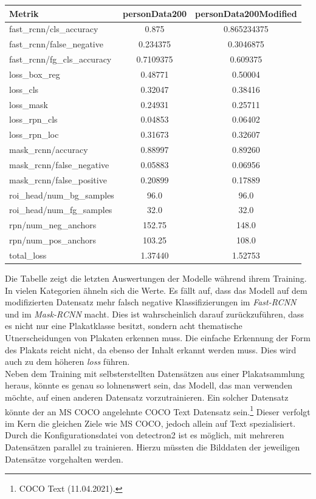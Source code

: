 \documentclass[a4paper,12pt,ngerman]{article}
\begin{document}
\begin{tabular}[h]{l|c|c}
	Metrik & personData200 & personData200Modified \\
	\hline
	fast\_rcnn/cls\_accuracy & 0.875 & 0.865234375 \\
	fast\_rcnn/false\_negative & 0.234375 & 0.3046875 \\
	fast\_rcnn/fg\_cls\_accuracy & 0.7109375 & 0.609375 \\
	\hline
	loss\_box\_reg & 0.48771 & 0.50004 \\
	loss\_cls & 0.32047 & 0.38416 \\
	loss\_mask & 0.24931 & 0.25711 \\
	loss\_rpn\_cls & 0.04853 & 0.06402 \\
	loss\_rpn\_loc & 0.31673 & 0.32607 \\
	\hline
	mask\_rcnn/accuracy & 0.88997 & 0.89260 \\
	mask\_rcnn/false\_negative & 0.05883 & 0.06956 \\
	mask\_rcnn/false\_positive & 0.20899 & 0.17889 \\
	\hline
	roi\_head/num\_bg\_samples & 96.0 & 96.0 \\
	roi\_head/num\_fg\_samples & 32.0 & 32.0 \\
	\hline
	rpn/num\_neg\_anchors & 152.75 & 148.0 \\
	rpn/num\_pos\_anchors & 103.25 & 108.0 \\
	\hline
	total\_loss & 1.37440 & 1.52753
\end{tabular}
\linebreak
\linebreak
Die Tabelle zeigt die letzten Auswertungen der Modelle während ihrem Training. In vielen Kategorien ähneln sich die Werte. Es fällt auf, dass das Modell auf dem modifizierten Datensatz mehr falsch negative Klassifizierungen im \textit{Fast-RCNN} und im \textit{Mask-RCNN} macht. Dies ist wahrscheinlich darauf zurückzuführen, dass es nicht nur eine Plakatklasse besitzt, sondern acht thematische Utnerscheidungen von Plakaten erkennen muss. Die einfache Erkennung der Form des Plakats reicht nicht, da ebenso der Inhalt erkannt werden muss. Dies wird auch zu dem höheren \textit{loss} führen. \\
Neben dem Training mit selbsterstellten Datensätzen aus einer Plakatsammlung heraus, könnte es genau so lohnenswert sein, das Modell, das man verwenden möchte, auf einen anderen Datensatz vorzutrainieren. Ein solcher Datensatz könnte der an MS COCO angelehnte COCO Text Datensatz sein.\footnote{COCO Text (11.04.2021).} Dieser verfolgt im Kern die gleichen Ziele wie MS COCO, jedoch allein auf Text spezialisiert. Durch die Konfigurationsdatei von detectron2 ist es möglich, mit mehreren Datensätzen parallel zu trainieren. Hierzu müssten die Bilddaten der jeweiligen Datensätze vorgehalten werden. \\
\end{document}
